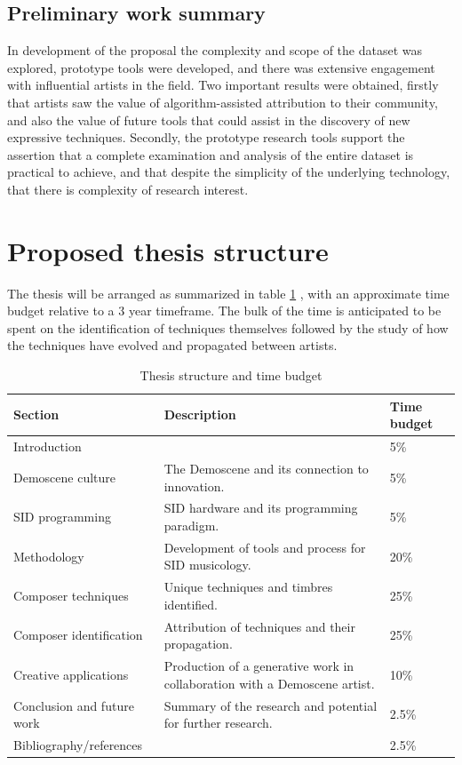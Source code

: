 \documentclass[10pt]{article}
\begin{document}
\begin{multicols*}{2}
\subsection{Preliminary work summary}

In development of the proposal the complexity and scope of the dataset was explored, prototype tools were developed, and there was extensive engagement with influential artists in the field. Two important results were obtained, firstly that artists saw the value of algorithm-assisted attribution to their community, and also the value of future tools that could assist in the discovery of new expressive techniques. Secondly, the prototype research tools support the assertion that a complete examination and analysis of the entire dataset is practical to achieve, and that despite the simplicity of the underlying technology, that there is complexity of research interest.

\section{Proposed thesis structure}

The thesis will be arranged as summarized in table \ref{table:timebudget} , with an approximate time budget relative to a 3 year timeframe. The bulk of the time is anticipated to be spent on the identification of techniques themselves followed by the study of how the techniques have evolved and propagated between artists.

\begin{table}[htb]
  \begin{tabular}{|l|l|l|}
        \hline
        Section & Description & Time budget \\
        \hline
        Introduction &  & 5\% \\
        \hline
        Demoscene culture & The Demoscene and its connection to innovation. & 5\% \\
        \hline
        SID programming & SID hardware and its programming paradigm. & 5\% \\
        \hline
        Methodology & Development of tools and process for SID musicology. & 20\% \\
        \hline
        Composer techniques & Unique techniques and timbres identified. & 25\% \\
        \hline
        Composer identification & Attribution of techniques and their propagation. & 25\% \\
        \hline
        Creative applications & Production of a generative work in collaboration with a Demoscene artist.  & 10\% \\
        \hline
        Conclusion and future work & Summary of the research and potential for further research. & 2.5\% \\
        \hline
        Bibliography/references &  & 2.5\% \\
        \hline
  \end{tabular}
  \caption{Thesis structure and time budget}
  \label{table:timebudget}
\end{table}



\end{multicols*}
\end{document}
